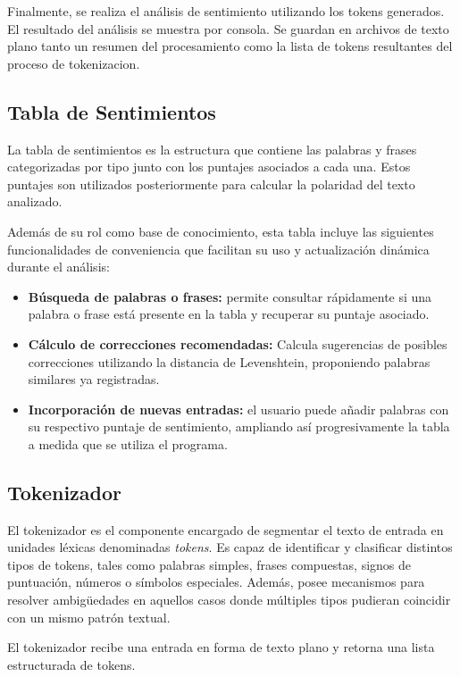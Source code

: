 Finalmente, se realiza el análisis de sentimiento utilizando los tokens generados. El resultado
del análisis se muestra por consola. Se guardan en archivos de texto plano tanto un resumen del
procesamiento como la lista de tokens resultantes del proceso de tokenizacion.

\subsection{Tabla de Sentimientos}
La tabla de sentimientos es la estructura que contiene las palabras y frases categorizadas por
tipo junto con los puntajes asociados a cada una. Estos puntajes son utilizados posteriormente
para calcular la polaridad del texto analizado.

Además de su rol como base de conocimiento, esta tabla incluye las siguientes funcionalidades
de conveniencia que facilitan su uso y actualización dinámica durante el análisis:

\begin{itemize}
	\item \textbf{Búsqueda de palabras o frases:} permite consultar rápidamente si una palabra
	      o frase está presente en la tabla y recuperar su puntaje asociado.

	\item \textbf{Cálculo de correcciones recomendadas:} Calcula sugerencias de posibles
	      correcciones utilizando la distancia de Levenshtein, proponiendo palabras similares ya
	      registradas.

	\item \textbf{Incorporación de nuevas entradas:} el usuario puede añadir palabras con
	      su respectivo puntaje de sentimiento, ampliando así progresivamente la tabla a medida
	      que se utiliza el programa.
\end{itemize}

\subsection{Tokenizador}
El tokenizador es el componente encargado de segmentar el texto de entrada en unidades léxicas
denominadas \emph{tokens}. Es capaz de identificar y clasificar distintos tipos de tokens,
tales como palabras simples, frases compuestas, signos de puntuación, números o símbolos
especiales. Además, posee mecanismos para resolver ambigüedades en aquellos casos donde
múltiples tipos pudieran coincidir con un mismo patrón textual.

El tokenizador recibe una entrada en forma de texto plano y retorna una lista estructurada de
tokens.

